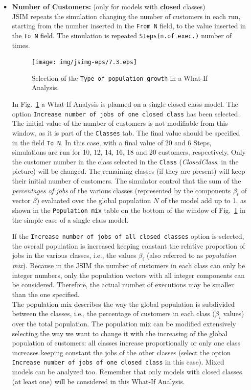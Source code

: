 \begin{itemize}
\item \textbf{Number of Customers:} (only for models with
\textbf{closed} classes)\\
JSIM repeats the simulation changing
the number of customers in each run, starting from the number
inserted in the \texttt{From N} field, to the value inserted in
the \texttt{To N} field. The simulation is repeated
\texttt{Steps(n.of exec.)} number of times.
\begin{figure}[hbt]
    \begin{center}
        \texttt{[image: img/jsimg-eps/7.3.eps]}
    \end{center}
    \caption{Selection of the \texttt{Type of population growth} in
    a What-If Analysis.}
    \label{fig:seltypepopg}
\end{figure}
In Fig.~\ref{fig:seltypepopg} a What-If Analysis is planned on a
single closed class model. The option \texttt{Increase number of
jobs of one closed class} has been selected. The initial value of
the number of customers is not modifiable from this window, as it
is part of the \texttt{Classes} tab. The final value should be
specified in the field \texttt{To N}. In this case, with a final
value of 20 and 6 Steps, simulations are run for 10, 12, 14, 16,
18 and 20 customers, respectively. Only the customer number in the
class selected in the \texttt{Class} (\emph{ClosedClass}, in the
picture) will be changed. The remaining classes (if they are
present) will keep their initial number of customers. The
simulator control that the sum of the \emph{percentages of jobs}
of the various classes (represented by the components $\beta_i$ of
vector \textbf{$\beta$}) evaluated over the global population $N$
of the model add up to 1, as shown in the \texttt{Population mix}
table on the bottom of the window of Fig.~\ref{fig:seltypepopg} in
the simple case of a single class model.

If the \texttt{Increase number of jobs of all closed classes}
option is selected, the overall population is increased keeping
constant the relative proportion of jobs in the various classes,
i.e., the values $\beta_i$ (also referred to as \emph{population
mix}). Because in the JSIM the number of customers in each class
can only be integer numbers, only the population vectors with all
integer components can be considered. Therefore, the actual number
of executions may be
smaller than the one specified.\\
The population mix describes the way the global population is
subdivided between the classes, i.e., the percentage of customers
in each class ($\beta_i$ values) over the total population. The
population mix can be modified extensively selecting the way we
want to change it with the increasing of the global population of
customers: all classes increase proportionally or only one class
increases keeping constant the jobs of the other classes (select
the option \texttt{Increase number of jobs of one closed class} in
this case). Mixed models can be analyzed too. Remember that only
models with closed classes (at least one) will be considered in
this What-If Analysis.


\end{itemize}
